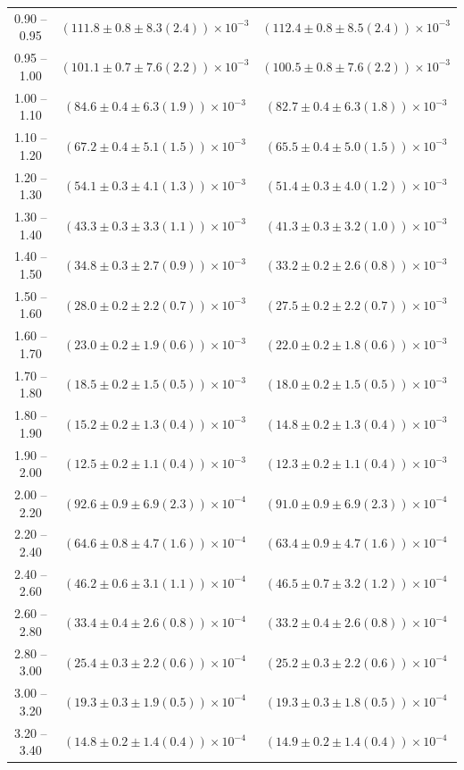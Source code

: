 \begin{table}
\begin{center}
\begin{tabular}{ c | c c }
0.90 -- 0.95 & $(111.8\pm0.8\pm8.3(2.4))\times10^{-3}$ & $(112.4\pm0.8\pm8.5(2.4))\times10^{-3}$ \\ 
0.95 -- 1.00 & $(101.1\pm0.7\pm7.6(2.2))\times10^{-3}$ & $(100.5\pm0.8\pm7.6(2.2))\times10^{-3}$ \\ 
1.00 -- 1.10 & $(84.6\pm0.4\pm6.3(1.9))\times10^{-3}$ & $(82.7\pm0.4\pm6.3(1.8))\times10^{-3}$ \\ 
1.10 -- 1.20 & $(67.2\pm0.4\pm5.1(1.5))\times10^{-3}$ & $(65.5\pm0.4\pm5.0(1.5))\times10^{-3}$ \\ 
1.20 -- 1.30 & $(54.1\pm0.3\pm4.1(1.3))\times10^{-3}$ & $(51.4\pm0.3\pm4.0(1.2))\times10^{-3}$ \\ 
1.30 -- 1.40 & $(43.3\pm0.3\pm3.3(1.1))\times10^{-3}$ & $(41.3\pm0.3\pm3.2(1.0))\times10^{-3}$ \\ 
1.40 -- 1.50 & $(34.8\pm0.3\pm2.7(0.9))\times10^{-3}$ & $(33.2\pm0.2\pm2.6(0.8))\times10^{-3}$ \\ 
1.50 -- 1.60 & $(28.0\pm0.2\pm2.2(0.7))\times10^{-3}$ & $(27.5\pm0.2\pm2.2(0.7))\times10^{-3}$ \\ 
1.60 -- 1.70 & $(23.0\pm0.2\pm1.9(0.6))\times10^{-3}$ & $(22.0\pm0.2\pm1.8(0.6))\times10^{-3}$ \\ 
1.70 -- 1.80 & $(18.5\pm0.2\pm1.5(0.5))\times10^{-3}$ & $(18.0\pm0.2\pm1.5(0.5))\times10^{-3}$ \\ 
1.80 -- 1.90 & $(15.2\pm0.2\pm1.3(0.4))\times10^{-3}$ & $(14.8\pm0.2\pm1.3(0.4))\times10^{-3}$ \\ 
1.90 -- 2.00 & $(12.5\pm0.2\pm1.1(0.4))\times10^{-3}$ & $(12.3\pm0.2\pm1.1(0.4))\times10^{-3}$ \\ 
2.00 -- 2.20 & $(92.6\pm0.9\pm6.9(2.3))\times10^{-4}$ & $(91.0\pm0.9\pm6.9(2.3))\times10^{-4}$ \\ 
2.20 -- 2.40 & $(64.6\pm0.8\pm4.7(1.6))\times10^{-4}$ & $(63.4\pm0.9\pm4.7(1.6))\times10^{-4}$ \\ 
2.40 -- 2.60 & $(46.2\pm0.6\pm3.1(1.1))\times10^{-4}$ & $(46.5\pm0.7\pm3.2(1.2))\times10^{-4}$ \\ 
2.60 -- 2.80 & $(33.4\pm0.4\pm2.6(0.8))\times10^{-4}$ & $(33.2\pm0.4\pm2.6(0.8))\times10^{-4}$ \\ 
2.80 -- 3.00 & $(25.4\pm0.3\pm2.2(0.6))\times10^{-4}$ & $(25.2\pm0.3\pm2.2(0.6))\times10^{-4}$ \\ 
3.00 -- 3.20 & $(19.3\pm0.3\pm1.9(0.5))\times10^{-4}$ & $(19.3\pm0.3\pm1.8(0.5))\times10^{-4}$ \\ 
3.20 -- 3.40 & $(14.8\pm0.2\pm1.4(0.4))\times10^{-4}$ & $(14.9\pm0.2\pm1.4(0.4))\times10^{-4}$ \\ 

\end{tabular}
\end{center}
\end{table}
